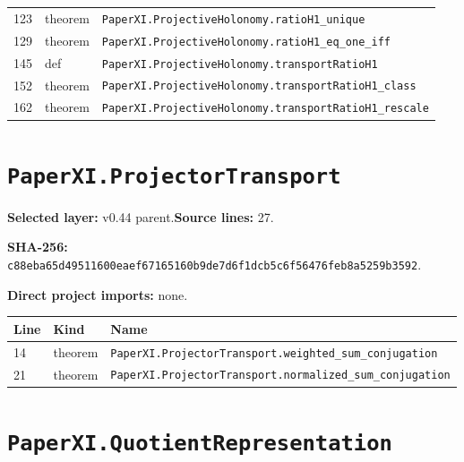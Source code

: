 \documentclass[10pt,oneside]{book}
\begin{document}
\begin{longtable}{@{}p{}p{}p{}@{}}
123&theorem&\nolinkurl{PaperXI.ProjectiveHolonomy.ratioH1_unique}\\

129&theorem&\nolinkurl{PaperXI.ProjectiveHolonomy.ratioH1_eq_one_iff}\\

145&def&\nolinkurl{PaperXI.ProjectiveHolonomy.transportRatioH1}\\

152&theorem&\nolinkurl{PaperXI.ProjectiveHolonomy.transportRatioH1_class}\\

162&theorem&\nolinkurl{PaperXI.ProjectiveHolonomy.transportRatioH1_rescale}\\

\bottomrule\end{longtable}

\section{\texorpdfstring{\nolinkurl{PaperXI.ProjectorTransport}}{PaperXI.ProjectorTransport}}\label{module:PaperXI.ProjectorTransport}

\textbf{Selected layer:} v0.44 parent.\quad\textbf{Source lines:} 27.\par\textbf{SHA-256:} {\scriptsize\nolinkurl{c88eba65d49511600eaef67165160b9de7d6f1dcb5c6f56476feb8a5259b3592}}.


\textbf{Direct project imports:} none.

\begin{longtable}{@{}p{}p{}p{}@{}}\toprule Line&Kind&Name\\\midrule\endhead

14&theorem&\nolinkurl{PaperXI.ProjectorTransport.weighted_sum_conjugation}\\

21&theorem&\nolinkurl{PaperXI.ProjectorTransport.normalized_sum_conjugation}\\

\bottomrule\end{longtable}

\section{\texorpdfstring{\nolinkurl{PaperXI.QuotientRepresentation}}{PaperXI.QuotientRepresentation}}\label{module:PaperXI.QuotientRepresentation}
\end{document}
